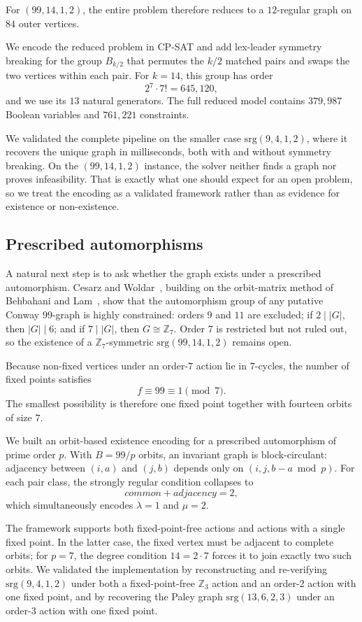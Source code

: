\documentclass{article}
\begin{document}
For $(99,14,1,2)$, the entire problem therefore reduces to a $12$-regular
graph on $84$ outer vertices.

We encode the reduced problem in CP-SAT and add lex-leader symmetry breaking
for the group $B_{k/2}$ that permutes the $k/2$ matched pairs and swaps the
two vertices within each pair. For $k=14$, this group has order
\[
2^7\cdot7!=645{,}120,
\]
and we use its $13$ natural generators. The full reduced model contains
$379{,}987$ Boolean variables and $761{,}221$ constraints.

We validated the complete pipeline on the smaller case
$\mathrm{srg}(9,4,1,2)$, where it recovers the unique graph in milliseconds,
both with and without symmetry breaking. On the $(99,14,1,2)$ instance, the
solver neither finds a graph nor proves infeasibility. That is exactly what
one should expect for an open problem, so we treat the encoding as a validated
framework rather than as evidence for existence or non-existence.

\subsection{Prescribed automorphisms}
A natural next step is to ask whether the graph exists under a prescribed
automorphism. Cesarz and Woldar~\cite{cesarz2023}, building on the
orbit-matrix method of Behbahani and Lam~\cite{behbahani2011}, show that the
automorphism group of any putative Conway 99-graph is highly constrained:
orders $9$ and $11$ are excluded; if $2\mid|G|$, then $|G|\mid6$; and if
$7\mid|G|$, then $G\cong\mathbb{Z}_7$. Order $7$ is restricted but not ruled
out, so the existence of a $\mathbb{Z}_7$-symmetric
$\mathrm{srg}(99,14,1,2)$ remains open.

Because non-fixed vertices under an order-$7$ action lie in $7$-cycles, the
number of fixed points satisfies
\[
f\equiv99\equiv1\pmod7.
\]
The smallest possibility is therefore one fixed point together with fourteen
orbits of size $7$.

We built an orbit-based existence encoding for a prescribed automorphism of
prime order $p$. With $B=99/p$ orbits, an invariant graph is
block-circulant: adjacency between $(i,a)$ and $(j,b)$ depends only on
$(i,j,b-a\bmod p)$. For each pair class, the strongly regular condition
collapses to
\[
\textit{common}+\textit{adjacency}=2,
\]
which simultaneously encodes $\lambda=1$ and $\mu=2$.

The framework supports both fixed-point-free actions and actions with a single
fixed point. In the latter case, the fixed vertex must be adjacent to complete
orbits; for $p=7$, the degree condition $14=2\cdot7$ forces it to join exactly
two such orbits. We validated the implementation by reconstructing and
re-verifying $\mathrm{srg}(9,4,1,2)$ under both a fixed-point-free
$\mathbb{Z}_3$ action and an order-$2$ action with one fixed point, and by
recovering the Paley graph $\mathrm{srg}(13,6,2,3)$ under an order-$3$ action
with one fixed point.
\end{document}
